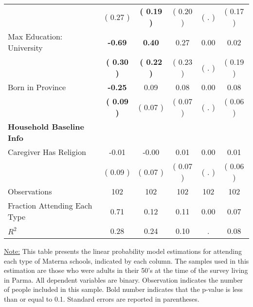 \begin{table}[H]
{\begin{tabular}{lccccc}
\quad  & (     0.27 ) & \textbf{(     0.19 )}  & (     0.20 )  & (        . ) & (     0.17 ) \\
\quad Max Education: University & \textbf{    -0.69} & \textbf{     0.40} &      0.27 &      0.00 &      0.02 \\
\quad  & \textbf{(     0.30 )} & \textbf{(     0.22 )}  & (     0.23 )  & (        . ) & (     0.19 ) \\
\quad Born in Province & \textbf{    -0.25} &      0.09 &      0.08 &      0.00 &      0.08 \\
\quad  & \textbf{(     0.09 )} & (     0.07 )  & (     0.07 )  & (        . ) & (     0.06 ) \\
\midrule
\textbf{Household Baseline Info} \\
\quad Caregiver Has Religion &     -0.01 &     -0.00 &      0.01 &      0.00 &      0.01 \\
\quad  & (     0.09 ) & (     0.07 )  & (     0.07 )  & (        . ) & (     0.06 ) \\
\midrule
Observations & 102 & 102 & 102 & 102 & 102 \\
Fraction Attending Each Type &      0.71 &      0.12 &      0.11 &      0.00 &      0.07 \\
\midrule
$ R^2$ &      0.28 &      0.24 &      0.10 &         . &      0.08 \\
\bottomrule
\end{tabular}}
\end{table}
\begin{scriptsize}
\noindent\underline{Note:} This table presents the linear probability model estimations for attending each type of Materna schools, indicated by each column. The samples used in this estimation are those who were adults in their 50's at the time of the survey living in Parma. All dependent variables are binary. Observation indicates the number of people included in this sample. Bold number indicates that the p-value is less than or equal to 0.1. Standard errors are reported in parentheses.
\end{scriptsize}
